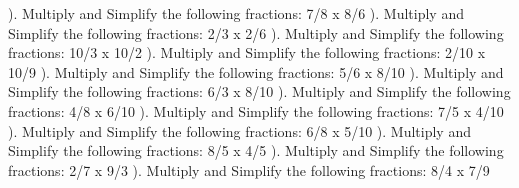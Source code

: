 \documentclass{article}%
\begin{document}
\newline%
\newline%
). Multiply and Simplify the following fractions: 7/8 x 8/6%
\newline%
\newline%
). Multiply and Simplify the following fractions: 2/3 x 2/6%
\newline%
\newline%
). Multiply and Simplify the following fractions: 10/3 x 10/2%
\newline%
\newline%
). Multiply and Simplify the following fractions: 2/10 x 10/9%
\newline%
\newline%
). Multiply and Simplify the following fractions: 5/6 x 8/10%
\newline%
\newline%
). Multiply and Simplify the following fractions: 6/3 x 8/10%
\newline%
\newline%
). Multiply and Simplify the following fractions: 4/8 x 6/10%
\newline%
\newline%
). Multiply and Simplify the following fractions: 7/5 x 4/10%
\newline%
\newline%
). Multiply and Simplify the following fractions: 6/8 x 5/10%
\newline%
\newline%
). Multiply and Simplify the following fractions: 8/5 x 4/5%
\newline%
\newline%
). Multiply and Simplify the following fractions: 2/7 x 9/3%
\newline%
\newline%
). Multiply and Simplify the following fractions: 8/4 x 7/9%
\newline%
\end{document}
